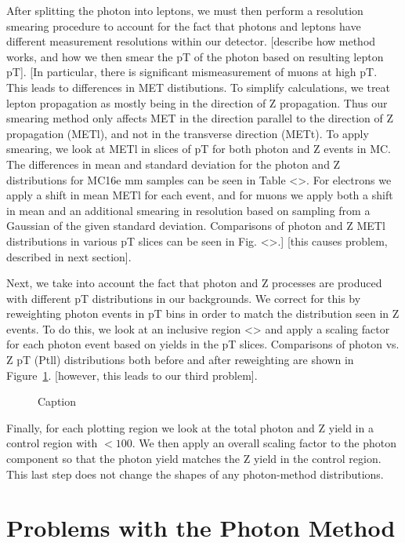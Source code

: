 After splitting the photon into leptons, we must then perform a resolution smearing procedure to account for the fact that photons and leptons have different measurement resolutions within our detector. [describe how method works, and how we then smear the pT of the photon based on resulting lepton pT]. [In particular, there is significant mismeasurement of muons at high pT. This leads to differences in MET distibutions. To simplify calculations, we treat lepton propagation as mostly being in the direction of Z propagation. Thus our smearing method only affects MET in the direction parallel to the direction of Z propagation (METl), and not in the transverse direction (METt). To apply smearing, we look at METl in slices of pT for both photon and Z events in MC. The differences in mean and standard deviation for the photon and Z distributions for MC16e mm samples can be seen in Table <>. For electrons we apply a shift in mean METl for each event, and for muons we apply both a shift in mean and an additional smearing in resolution based on sampling from a Gaussian of the given standard deviation. Comparisons of photon and Z METl distributions in various pT slices can be seen in Fig. <>.] [this causes problem, described in next section].

Next, we take into account the fact that photon and Z processes are produced with different pT distributions in our backgrounds. We correct for this by reweighting photon events in pT bins in order to match the distribution seen in Z events. To do this, we look at an inclusive region <> and apply a scaling factor for each photon event based on yields in the pT slices. Comparisons of photon vs. Z pT (Ptll) distributions both before and after reweighting are shown in Figure~\ref{fig:reweighting}. [however, this leads to our third problem].

\begin{figure}
    \centering
    \caption{Caption}
    \label{fig:reweighting}
\end{figure}

Finally, for each plotting region we look at the total photon and Z yield in a control region with \MET$<100$. We then apply an overall scaling factor to the photon component so that the photon yield matches the Z yield in the control region. This last step does not change the shapes of any photon-method distributions.

\section{Problems with the Photon Method}

